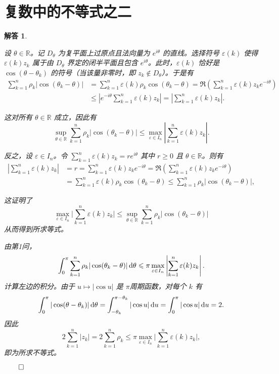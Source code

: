 \documentclass[12pt,UTF8]{ctexbook}
\theoremstyle{exercisestyle}
\theoremstyle{solutionstyle}
\newtheorem*{solution*}{解答}
\newenvironment{solution}
  {\begin{solution*}}
  {\hfill\ensuremath{\qed}\end{solution*}}
\begin{document}
\section{复数中的不等式之二}
\begin{solution}
\begin{subquestions}
\item 设 \( \theta \in \mathbb{R} \)。记 \( D_{\theta} \) 为复平面上过原点且法向量为 \( e^{i\theta} \) 的直线。选择符号 \( \varepsilon(k) \) 使得 \( \varepsilon(k)z_k \) 属于由 \( D_{\theta} \) 界定的闭半平面且包含 \( e^{i\theta} \)。此时，\( \varepsilon(k) \) 恰好是 \( \cos(\theta - \theta_k) \) 的符号（当该量非零时，即 \( z_k \notin D_\theta \)）。于是有
\begin{align*}
\sum_{k=1}^{n} \rho_k |\cos(\theta_k - \theta)| &= \sum_{k=1}^{n} \varepsilon(k)\rho_k \cos(\theta_k - \theta) = \Re \left(\sum_{k=1}^{n} \varepsilon(k)z_k e^{-i\theta}\right)\\
&\leqslant \left|e^{-i\theta} \sum_{k=1}^{n} \varepsilon(k)z_k\right| = \left|\sum_{k=1}^{n} \varepsilon(k)z_k\right|.
\end{align*}

这对所有 \( \theta \in \mathbb{R} \) 成立，因此有
\[
\sup_{\theta \in \mathbb{R}} \sum_{k=1}^n \rho_k |\cos(\theta_k - \theta)| \leqslant \max_{\varepsilon \in I_n} \left| \sum_{k=1}^n \varepsilon(k) z_k \right|.
\]

反之，设 \( \varepsilon \in I_n \)。令 \( \sum_{k=1}^n \varepsilon(k) z_k = r e^{i\theta} \) 其中 \( r \geq 0 \) 且 \( \theta \in \mathbb{R} \)。则有
\begin{align*}  
\left| \sum_{k=1}^{n} \varepsilon(k) z_k \right| &= r = \sum_{k=1}^{n} \varepsilon(k) z_k e^{-i\theta} = \Re \left( \sum_{k=1}^{n} \varepsilon(k) z_k e^{-i\theta} \right) \\
&= \sum_{k=1}^{n} \varepsilon(k) \rho_k \cos(\theta_k - \theta) \leqslant \sum_{k=1}^{n} \rho_k |\cos(\theta_k - \theta)|,
\end{align*}

这证明了
\[
\max_{\varepsilon \in I_n} \Big| \sum_{k=1}^n \varepsilon(k) z_k \Big| \leqslant \sup_{\theta \in \mathbb{R}} \sum_{k=1}^n \rho_k |\cos(\theta_k - \theta)|
\]
从而得到所求等式。

\item 由第1问，
\[
\int_0^{\pi} \sum_{k=1}^n \rho_k |\cos(\theta_k - \theta)| \,\mathrm{d}\theta \leqslant \pi \max_{\varepsilon \in I_n} \left| \sum_{k=1}^n \varepsilon(k) z_k \right|.
\]
计算左边的积分。由于 \( u \mapsto |\cos u| \) 是 \(\pi\)\dash 周期函数，对每个 \(k\) 有
\[
\int_0^{\pi} |\cos(\theta - \theta_k)| \,\mathrm{d}\theta = \int_{-\theta_k}^{\pi - \theta_k} |\cos u| \,\mathrm{d}u = \int_0^{\pi} |\cos u| \,\mathrm{d}u = 2.
\]
因此
\[
2\sum_{k=1}^{n}|z_{k}|=2\sum_{k=1}^{n}\rho_{k}\leqslant\pi\max_{\varepsilon\in I_{n}}\Big|\sum_{k=1}^{n}\varepsilon(k)z_{k}\Big|,
\]
即为所求不等式。


\end{subquestions}
\end{solution}
\end{document}
